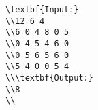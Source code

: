 \begin{verbatim}
\textbf{Input:}
\\12 6 4
\\6 0 4 8 0 5
\\0 4 5 4 6 0
\\0 5 6 5 6 0
\\5 4 0 0 5 4
\\\textbf{Output:}
\\8
\\\end{verbatim}